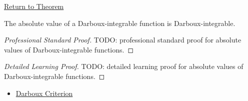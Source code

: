 \newpage
{}
\label{prf:darboux-integrable-absolute-value}

\begin{remark*}[Return]
\hyperref[thm:darboux-integrable-absolute-value]{Return to Theorem}
\end{remark*}

\begin{theorem*}
The absolute value of a Darboux-integrable function is Darboux-integrable.
\end{theorem*}

\begin{proof}[Professional Standard Proof]
\LRAProofBodyStart
TODO: professional standard proof for absolute values of Darboux-integrable functions.
\end{proof}

\begin{proof}[Detailed Learning Proof]
\LRAProofBodyStart
TODO: detailed learning proof for absolute values of Darboux-integrable functions.
\end{proof}

\begin{remark*}
\end{remark*}

\begin{dependencies}
\begin{itemize}
  \item \hyperref[thm:darboux-criterion]{Darboux Criterion}
\end{itemize}
\end{dependencies}

\clearpage
